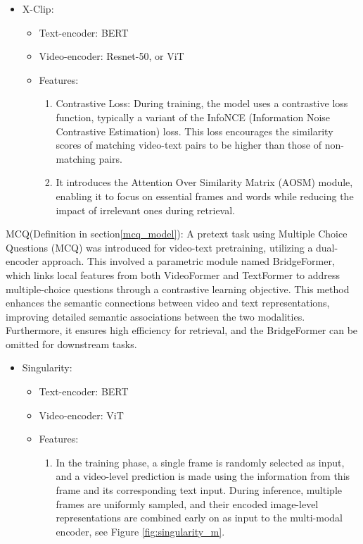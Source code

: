 \begin{itemize}
\item 	X-Clip:
\begin{itemize}
\item Text-encoder: BERT
\item Video-encoder: Resnet-50, or ViT
\item Features:
\begin{enumerate}
\item Contrastive Loss: During training, the model uses a contrastive loss function, typically a variant of the InfoNCE (Information Noise Contrastive Estimation) loss. This loss encourages the similarity scores of matching video-text pairs to be higher than those of non-matching pairs.
\item It introduces the Attention Over Similarity Matrix (AOSM) module, enabling it to focus on essential frames and words while reducing the impact of irrelevant ones during retrieval.
\end{enumerate}
\end{itemize}
\end{itemize}

MCQ(Definition in section\ref{mcq_model}): A pretext task using Multiple Choice Questions (MCQ) was introduced for video-text pretraining, utilizing a dual-encoder approach. This involved a parametric module named BridgeFormer, which links local features from both VideoFormer and TextFormer to address multiple-choice questions through a contrastive learning objective. This method enhances the semantic connections between video and text representations, improving detailed semantic associations between the two modalities. Furthermore, it ensures high efficiency for retrieval, and the BridgeFormer can be omitted for downstream tasks.

\begin{itemize}
\item Singularity:
\begin{itemize}
\item Text-encoder: BERT
\item Video-encoder: ViT
\item Features:
\begin{enumerate}
\item In the training phase, a single frame is randomly selected as input, and a video-level prediction is made using the information from this frame and its corresponding text input. During inference, multiple frames are uniformly sampled, and their encoded image-level representations are combined early on as input to the multi-modal encoder, see Figure \ref{fig:singularity_m}.
\end{enumerate}
\end{itemize}
\end{itemize}

